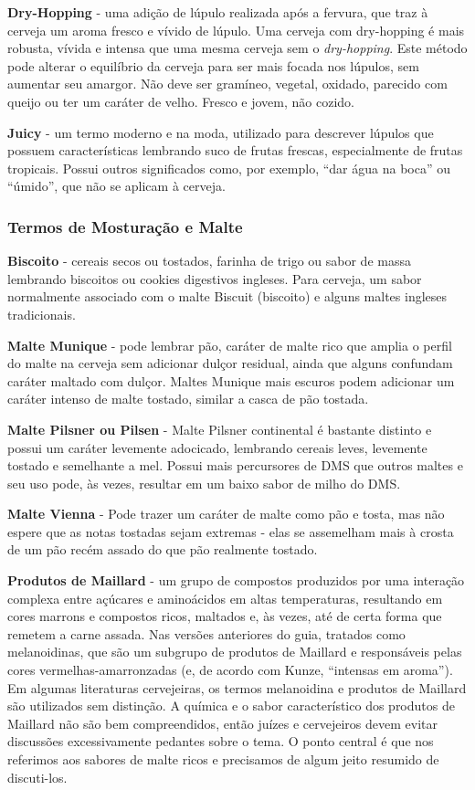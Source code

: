 \textbf{Dry-Hopping} - uma adição de lúpulo realizada após a fervura, que traz à cerveja um aroma fresco e vívido de lúpulo. Uma cerveja com dry-hopping é mais robusta, vívida e intensa que uma mesma cerveja sem o \textit{dry-hopping}. Este método pode alterar o equilíbrio da cerveja para ser mais focada nos lúpulos, sem aumentar seu amargor. Não deve ser gramíneo, vegetal, oxidado, parecido com queijo ou ter um caráter de velho. Fresco e jovem, não cozido.

\textbf{Juicy} - um termo moderno e na moda, utilizado para descrever lúpulos que possuem características lembrando suco de frutas frescas, especialmente de frutas tropicais. Possui outros significados como, por exemplo, “dar água na boca” ou “úmido”, que não se aplicam à cerveja.

\subsubsection*{Termos de Mosturação e Malte}
\textbf{Biscoito} - cereais secos ou tostados, farinha de trigo ou sabor de massa lembrando biscoitos ou cookies digestivos ingleses. Para cerveja, um sabor normalmente associado com o malte Biscuit (biscoito) e alguns maltes ingleses tradicionais.

\textbf{Malte Munique} - pode lembrar pão, caráter de malte rico que amplia o perfil do malte na cerveja sem adicionar dulçor residual, ainda que alguns confundam caráter maltado com dulçor. Maltes Munique mais escuros podem adicionar um caráter intenso de malte tostado, similar a casca de pão tostada.

\textbf{Malte Pilsner ou Pilsen} - Malte Pilsner continental é bastante distinto e possui um caráter levemente adocicado, lembrando cereais leves, levemente tostado e semelhante a mel. Possui mais percursores de DMS que outros maltes e seu uso pode, às vezes, resultar em um baixo sabor de milho do DMS.

\textbf{Malte Vienna} - Pode trazer um caráter de malte como pão e tosta, mas não espere que as notas tostadas sejam extremas - elas se assemelham mais à crosta de um pão recém assado do que pão realmente tostado.

\textbf{Produtos de Maillard} - um grupo de compostos produzidos por uma interação complexa entre açúcares e aminoácidos em altas temperaturas, resultando em cores marrons e compostos ricos, maltados e, às vezes, até de certa forma que remetem a carne assada. Nas versões anteriores do guia, tratados como melanoidinas, que são um subgrupo de produtos de Maillard e responsáveis pelas cores vermelhas-amarronzadas (e, de acordo com Kunze, “intensas em aroma”). Em algumas literaturas cervejeiras, os termos melanoidina e produtos de Maillard são utilizados sem distinção. A química e o sabor característico dos produtos de Maillard não são bem compreendidos, então juízes e cervejeiros devem evitar discussões excessivamente pedantes sobre o tema. O ponto central é que nos referimos aos sabores de malte ricos e precisamos de algum jeito resumido de discuti-los.

